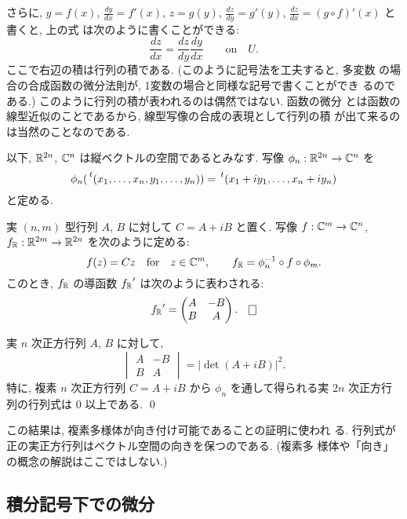 \documentclass[12pt,twoside]{jarticle}
\begin{document}
\noindent さらに, $y=f(x)$, $\frac{dy}{dx}=f'(x)$, $z=g(y)$,
$\frac{dz}{dy}=g'(y)$, $\frac{dz}{dx}=(g\circ f)'(x)$ と書くと, 上の式
は次のように書くことができる:
\[
  \frac{dz}{dx} = \frac{dz}{dy}\frac{dy}{dx}
    \qquad\text{on}\quad U.
\]%
ここで右辺の積は行列の積である. (このように記号法を工夫すると, 多変数
の場合の合成函数の微分法則が, 1変数の場合と同様な記号で書くことができ
るのである.) このように行列の積が表われるのは偶然ではない. 函数の微分
とは函数の線型近似のことであるから, 線型写像の合成の表現として行列の積
が出て来るのは当然のことなのである.

以下, ${\mathbb R}^{2n}$, ${\mathbb C}^n$ は縦ベクトルの空間であるとみなす. %
写像 $\phi_n : {\mathbb R}^{2n} \to {\mathbb C}^n$ を
\[%
  \phi_n(\transposed{(x_1, \dots, x_n, y_1, \dots, y_n)})
  = \transposed{(x_1 + i y_1, \dots, x_n + iy_n)}
\]%
と定める. 

\begin{question}
  実 $(n,m)$ 型行列 $A$, $B$ に対して $C=A+iB$ と置く. 写像 
  $f:{\mathbb C}^m\to{\mathbb C}^n$, $f_{\mathbb R}:{\mathbb R}^{2m}\to{\mathbb R}^{2n}$  を次のように定める:
  \[
    f(z) = C z \quad\text{for}\quad z \in {\mathbb C}^m,
    \qquad
    f_{\mathbb R} = \phi_n^{-1} \circ f \circ \phi_m.
  \]%
  このとき, $f_{\mathbb R}$ の導函数 ${f_{\mathbb R}}'$ は次のように表わされる:
  \[%
    {f_\R}'
    =
    \begin{pmatrix}
      A & -B \\
      B &  A
    \end{pmatrix}. 
    \qed
  \]%
\end{question}

\begin{question}
  実 $n$ 次正方行列 $A$, $B$ に対して, 
  \[%
    \begin{vmatrix}
      A & -B \\
      B &  A
    \end{vmatrix}
    =
    |\det(A+iB)|^2.
  \]%
  特に, 複素 $n$ 次正方行列 $C=A+iB$ から $\phi_n$ を通して得られる実 
  $2n$ 次正方行列の行列式は $0$ 以上である. 
  \qed
\end{question}

\noindent この結果は, 複素多様体が向き付け可能であることの証明に使われ
る. 行列式が正の実正方行列はベクトル空間の向きを保つのである. (複素多
様体や「向き」の概念の解説はここではしない.)


\subsection{積分記号下での微分}
\end{document}
